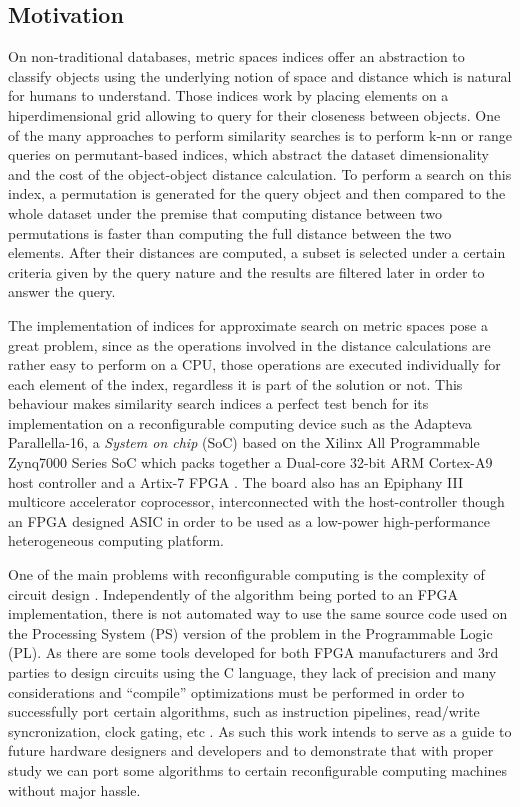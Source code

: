 \subsection{Motivation}
On non-traditional databases, metric spaces indices offer an abstraction to classify objects using
the underlying notion of space and distance which is natural for humans to understand. Those indices 
work by placing elements on a hiperdimensional grid allowing to query for their closeness between objects.
One of the many approaches to perform similarity searches is to perform k-nn or range queries 
on permutant-based indices, which abstract the dataset dimensionality and the cost of the 
object-object distance calculation. To perform a search on this index, a permutation is generated
for the query object and then compared to the whole dataset under the premise that computing
distance between two permutations is faster than computing the full distance between the two
elements. After their distances are computed, a subset is selected under a certain 
criteria given by the query nature and the results are filtered later in order to answer the query.
\cite{5271946,5271944}

The implementation of indices for approximate search on metric spaces pose a great problem, since 
as the operations involved in the distance calculations are rather easy to perform on a CPU, those
operations are executed individually for each element of the index, regardless it is part of the
solution or not. This behaviour makes similarity search indices a perfect test bench for its 
implementation on a reconfigurable computing device\cite{5999889} such as the Adapteva Parallella-16,
a \emph{System on chip} (SoC) based on the Xilinx All Programmable Zynq7000 Series SoC which packs together
a Dual-core 32-bit ARM Cortex-A9 host controller and a Artix-7 FPGA \cite{DBLP:journals/corr/OlofssonNZ14,LINLEY_1}.
The board also has an Epiphany III multicore accelerator coprocessor, interconnected with the host-controller
though an FPGA designed ASIC in order to be used as a low-power high-performance heterogeneous computing 
platform.

One of the main problems with reconfigurable computing is the complexity of circuit design \cite{SPA_thesis}. 
Independently of the algorithm being ported to an FPGA implementation, there is not automated way to use
the same source code used on the Processing System (PS) version of the problem in the Programmable Logic (PL). 
As there are some tools developed for both FPGA manufacturers and 3rd parties to design circuits using the C 
language, they lack of precision and many considerations and ``compile'' optimizations must be performed 
in order to successfully port certain algorithms\cite{SPA_thesis}, such as instruction pipelines, read/write 
syncronization, clock gating\cite{XILINX_clockgating}, etc \cite{XILINX_axi,XILINX_clockgating,
XILINX_ddr_rate,XILINX_mem_interface}. As such this work intends to serve as a guide to future hardware
designers and developers and to demonstrate that with proper study we can port some algorithms to
certain reconfigurable computing machines without major hassle.

